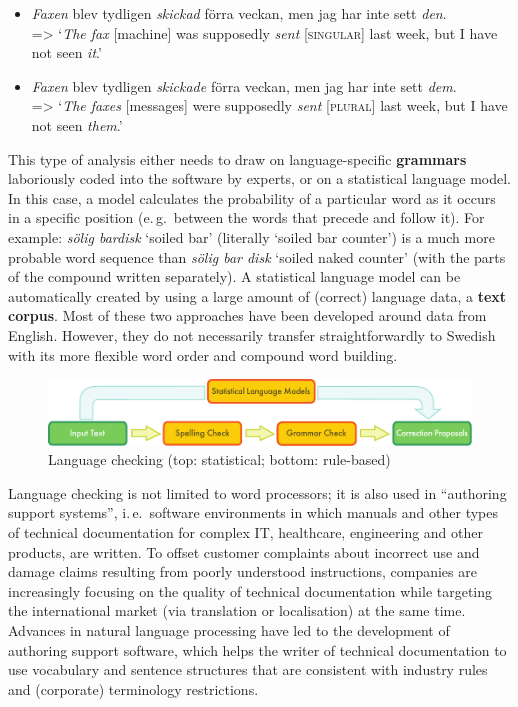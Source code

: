 \begin{multicols}{2}
\begin{itemize}
\item \textit{Faxen} blev tydligen \textit{skickad} förra veckan, men jag har inte sett \textit{den}.\\
=> ‘\emph{The fax} [machine] was supposedly \emph{sent} [\textsc{singular}] last week, but I have not seen \emph{it}.’
\item \textit{Faxen} blev tydligen \textit{skickade} förra veckan, men jag har inte sett \textit{dem}.\\
=> ‘\emph{The faxes} [messages] were supposedly \emph{sent} [\textsc{plural}] last week, but I have not seen \emph{them}.’
\end{itemize}

This type of analysis either needs to draw on language-specific
\textbf{grammars} laboriously coded into the software by experts, or
on a statistical language model. In this case, a model calculates the
probability of a particular word as it occurs in a specific position
(e.\,g.~between the words that precede and follow it). For example:
\textit{sölig bardisk} `soiled bar' (literally `soiled bar counter')
is a much more probable word sequence than \textit{sölig bar disk}
`soiled naked counter' (with the parts of the compound written
separately). A statistical language model can be automatically created
by using a large amount of (correct) language data, a \textbf{text
  corpus}. Most of these two approaches have been developed around
data from English. However, they do not necessarily transfer
straightforwardly to Swedish with its more flexible word order and
compound word building.

\begin{figure}[htb]
  \center
  \includegraphics[width=\textwidth]{../_media/english/language_checking}
  \caption{Language checking (top: statistical; bottom: rule-based)}
  \label{fig:langcheckingaarch_en}
\end{figure}

Language checking is not limited to word processors; it is also used in “authoring support systems”, i.\,e.~software environments in which manuals and other types of technical documentation for complex IT, healthcare, engineering and other products, are written. To offset customer complaints about incorrect use and damage claims resulting from poorly understood instructions, companies are increasingly focusing on the quality of technical documentation while targeting the international market (via translation or localisation) at the same time. Advances in natural language processing have led to the development of authoring support software, which helps the writer of technical documentation to use vocabulary and sentence structures that are consistent with industry rules and (corporate) terminology restrictions.


\end{multicols}
